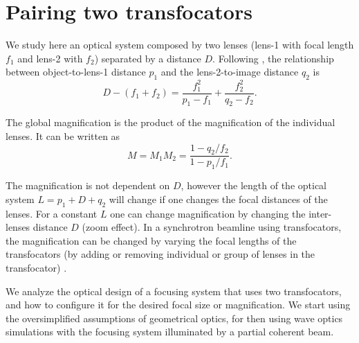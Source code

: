 \documentclass{iucr}              %
\begin{document}
\section{Pairing two transfocators}\label{sec:twolenses}


We study here an optical system composed by two lenses (lens-1 with focal length $f_1$ and lens-2 with $f_2$) separated by a distance $D$. Following , the relationship between object-to-lens-1 distance $p_1$ and the lens-2-to-image distance $q_2$ is
\begin{equation}
\label{eq:twolens}
    D-(f_1+f_2)=\frac{f_1^2}{p_1-f_1} + \frac{f_2^2}{q_2-f_2}.
\end{equation}

The global magnification is the product of the magnification of the individual lenses. It can be written as
\begin{equation}
\label{eq:magnification}
    M=M_1 M_2=\frac{1-q_2/f_2}{1-p_1/f_1}.
\end{equation}

The magnification is not dependent on $D$, however the length of the optical system $L=p_1+D+q_2$ will change if one changes the focal distances of the lenses. For a constant $L$ one can change magnification by changing the inter-lenses distance $D$ (zoom effect). In a synchrotron beamline using transfocators, the magnification can be changed by varying the focal lengths of the transfocators (by adding or removing individual or group of lenses in the transfocator) \cite{Vaughan:kv5084}.

We analyze the optical design of a focusing system that uses two transfocators, and how to configure it for the desired focal size or magnification. We start using the oversimplified assumptions of geometrical optics, for then using wave optics simulations with the focusing system illuminated by a partial coherent beam.
\end{document}
